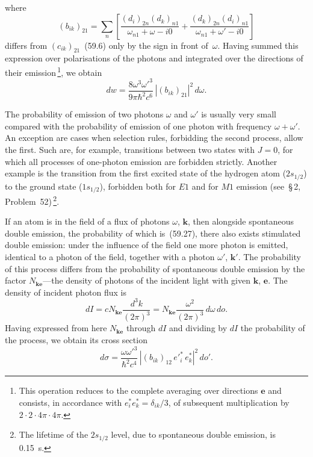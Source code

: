 where
\[
(b_{ik})_{21} = \sum_n\left[\frac{(d_i)_{2n}(d_k)_{n1}}{\omega_{n1} + \omega - i0} + \frac{(d_k)_{2n}(d_i)_{n1}}{\omega_{n1} + \omega' - i0}\right]
\]
differs from $(c_{ik})_{21}$~(59.6) only by the sign in front of~$\omega$. Having summed this expression over polarisations of the photons and integrated over the directions of their emission\,\footnote{This operation reduces to the complete averaging over directions $\mathbf{e}$ and consists, in accordance with $e^*_i e^*_k = \delta_{ik}/3$, of subsequent multiplication by $2 \cdot 2 \cdot 4\pi \cdot 4\pi$.}, we obtain
\begin{equation}
dw = \frac{8\omega^3\omega'^3}{9\pi\hbar^2c^6}\,|(b_{ik})_{21}|^2\,d\omega.
\tag{59.28}
\end{equation}

The probability of emission of two photons $\omega$ and $\omega'$ is usually very small compared with the probability of emission of one photon with frequency $\omega + \omega'$. An exception are cases when selection rules, forbidding the second process, allow the first. Such are, for example, transitions between two states with $J = 0$, for which all processes of one-photon emission are forbidden strictly. Another example is the transition from the first excited state of the hydrogen atom ($2s_{1/2}$) to the ground state ($1s_{1/2}$), forbidden both for $E1$ and for $M1$ emission (see~\S\,2, Problem~52)\,\footnote{The lifetime of the $2s_{1/2}$ level, due to spontaneous double emission, is 0.15~s.}.

If an atom is in the field of a flux of photons $\omega$, $\mathbf{k}$, then alongside spontaneous double emission, the probability of which is~(59.27), there also exists stimulated double emission: under the influence of the field one more photon is emitted, identical to a photon of the field, together with a photon $\omega'$, $\mathbf{k}'$. The probability of this process differs from the probability of spontaneous double emission by the factor $N_{\mathbf{ke}}$---the density of photons of the incident light with given $\mathbf{k}$, $\mathbf{e}$. The density of incident photon flux is
\[
dI = cN_{\mathbf{ke}}\frac{d^3k}{(2\pi)^3} = N_{\mathbf{ke}}\frac{\omega^2}{(2\pi)^3}\,d\omega\,do.
\]
Having expressed from here $N_{\mathbf{ke}}$ through $dI$ and dividing by $dI$ the probability of the process, we obtain its cross section
\begin{equation}
d\sigma = \frac{\omega\omega'^3}{\hbar^2c^4}\,|(b_{ik})_{12}\,e'^*_i\,e^*_k|^2\,do'.
\tag{59.29}
\end{equation}

